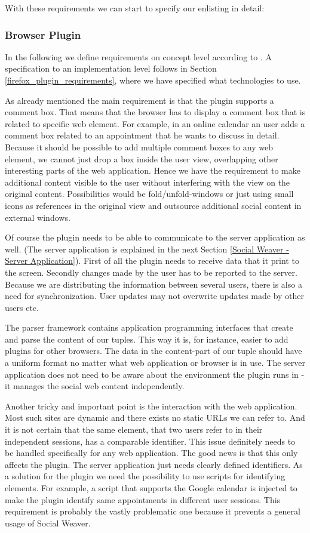 With these requirements we can start to specify our enlisting in detail:

\subsubsection{Browser Plugin}\label{browser_plugin}
In the following we define requirements on concept level according to \cite{van2009requirements}. A specification to an implementation level follows in Section \ref{firefox_plugin_requirements}, where we have specified what technologies to use.

As already mentioned the main requirement is that the plugin supports a comment box. That means that the browser has to display a comment box that is related to specific web element. For example, in an online calendar an user adds a comment box related to an appointment that he wants to discuss in detail. 
Because it should be possible to add multiple comment boxes to any web element, we cannot just drop a box inside the user view, overlapping other interesting parts of the web application. Hence we have the requirement to make additional content visible to the user without interfering with the view on the original content. Possibilities would be fold/unfold-windows or just using small icons as references in the original view and outsource additional social content in external windows.

Of course the plugin needs to be able to communicate to the server application as well. (The server application is explained in the next Section \ref{Social Weaver - Server Application}). First of all the plugin needs to receive data that it print to the screen. Secondly changes made by the user has to be reported to the server. Because we are distributing the information between several users, there is also a need for synchronization. User updates may not overwrite updates made by other users etc.

The parser framework contains application programming interfaces that create and parse the content of our tuples. This way it is, for instance, easier to add plugins for other browsers. 
The data in the content-part of our tuple should have a uniform format no matter what web application or browser is in use. The server application does
 not
 need to be aware about the environment the plugin runs in - it manages the social web content independently.

Another tricky and important point is the interaction with the web application. Most such sites are dynamic and there exists no static URLs we can refer to. And it is not certain that the same element, that two users refer to in their independent sessions, has a comparable identifier. This issue definitely needs to be handled specifically for any web application. The good news is that this only affects the plugin. The server application just needs clearly defined identifiers. As a solution for the plugin we need the possibility to use scripts for identifying elements. For example, a script that supports the Google calendar is injected to make the plugin identify same appointments in different user sessions. This requirement is probably the vastly problematic one because it prevents a general usage of Social Weaver.

